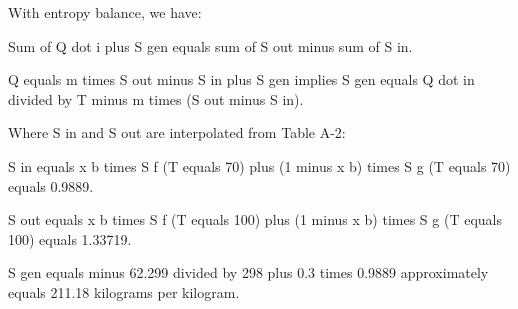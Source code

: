 With entropy balance, we have:

Sum of Q dot i plus S gen equals sum of S out minus sum of S in.

Q equals m times S out minus S in plus S gen implies S gen equals Q dot in divided by T minus m times (S out minus S in).

Where S in and S out are interpolated from Table A-2:

S in equals x b times S f (T equals 70) plus (1 minus x b) times S g (T equals 70) equals 0.9889.

S out equals x b times S f (T equals 100) plus (1 minus x b) times S g (T equals 100) equals 1.33719.

S gen equals minus 62.299 divided by 298 plus 0.3 times 0.9889 approximately equals 211.18 kilograms per kilogram.